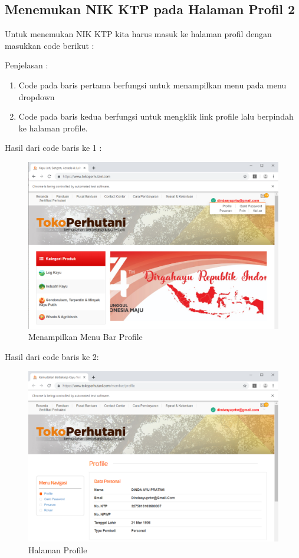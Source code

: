 \newpage
\subsection{Menemukan NIK KTP pada Halaman Profil 2}
Untuk menemukan NIK KTP kita harus masuk ke halaman profil dengan masukkan code berikut :


Penjelasan :
\begin{enumerate}
	\item Code pada baris pertama berfungsi untuk menampilkan menu pada menu dropdown 
	\item Code pada baris kedua berfungsi untuk mengklik link profile lalu berpindah ke halaman profile.
\end{enumerate}

Hasil dari code baris ke 1 :
\begin{figure}[h]
	\centering
	\includegraphics[scale=0.3]{figures/6menubar}
	\caption{Menampilkan Menu Bar Profile}
\end{figure}
\newpage
Hasil dari code baris ke 2:
\begin{figure}[h]
	\centering
	\includegraphics[scale=0.25]{figures/6profile}
	\caption{Halaman Profile}
\end{figure}

